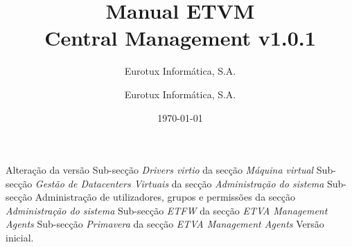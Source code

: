\documentclass[12pt,a4paper,portuges]{scrreprt}
\author{Eurotux Informática, S.A.}
\title{Manual ETVM\\ Central Management v1.0.1}
\subtitle{Eurotux Informática, S.A.}
\date{\today}
\begin{document}
\maketitle

\begin{Log}
Alteração da versão
Sub-secção \textit{Drivers virtio} da secção \textit{Máquina virtual}
Sub-secção \textit{Gestão de Datacenters Virtuais} da secção \textit{Administração do sistema}
Sub-secção Administração de utilizadores, grupos e permissões da secção \textit{Administração do sistema}
Sub-secção \textit{ETFW} da secção \textit{ETVA Management Agents}
Sub-secção \textit{Primavera} da secção \textit{ETVA Management Agents}
Versão inicial.
\end{Log}

\tableofcontents

\listoffigures


%
%


%
\end{document}
